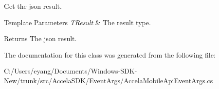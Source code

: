 Get the json result. 


\begin{DoxyTemplParams}{Template Parameters}
{\em T\+Result} & The result type.\\
\hline
\end{DoxyTemplParams}
\begin{DoxyReturn}{Returns}
The json result.
\end{DoxyReturn}


The documentation for this class was generated from the following file\+:\begin{DoxyCompactItemize}
\item 
C\+:/\+Users/eyang/\+Documents/\+Windows-\/\+S\+D\+K-\/\+New/trunk/src/\+Accela\+S\+D\+K/\+Event\+Args/Accela\+Mobile\+Api\+Event\+Args.\+cs\end{DoxyCompactItemize}
